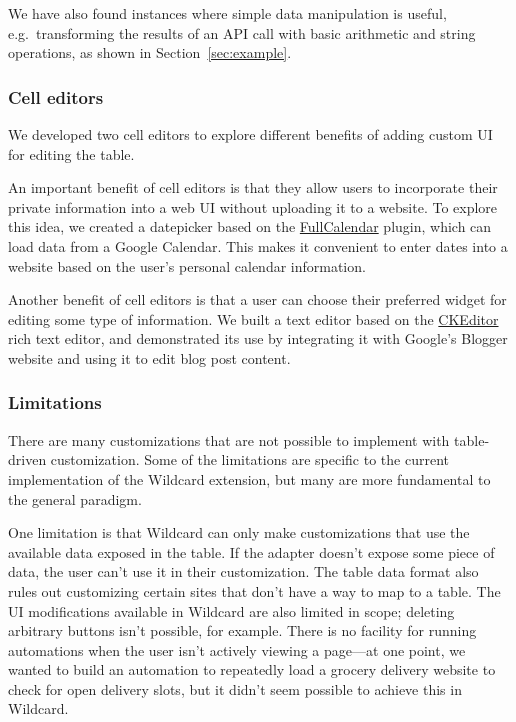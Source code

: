 \documentclass[sigplan,screen,10pt,anonymous,review]{acmart}
\begin{document}
We have also found instances where simple data manipulation is useful,
e.g.~transforming the results of an API call with basic arithmetic and
string operations, as shown in Section~\ref{sec:example}.

\hypertarget{cell-editors}{%
\subsubsection{Cell editors}\label{cell-editors}}

We developed two cell editors to explore different benefits of adding
custom UI for editing the table.

An important benefit of cell editors is that they allow users to
incorporate their private information into a web UI without uploading it
to a website. To explore this idea, we created a datepicker based on the
\href{https://fullcalendar.io/}{FullCalendar} plugin, which can load
data from a Google Calendar. This makes it convenient to enter dates
into a website based on the user's personal calendar information.

Another benefit of cell editors is that a user can choose their
preferred widget for editing some type of information. We built a text
editor based on the \href{https://ckeditor.com/}{CKEditor} rich text
editor, and demonstrated its use by integrating it with Google's Blogger
website and using it to edit blog post content.

\hypertarget{limitations}{%
\subsubsection{Limitations}\label{limitations}}

There are many customizations that are not possible to implement with
table-driven customization. Some of the limitations are specific to the
current implementation of the Wildcard extension, but many are more
fundamental to the general paradigm.

One limitation is that Wildcard can only make customizations that use
the available data exposed in the table. If the adapter doesn't expose
some piece of data, the user can't use it in their customization. The
table data format also rules out customizing certain sites that don't
have a way to map to a table. The UI modifications available in Wildcard
are also limited in scope; deleting arbitrary buttons isn't possible,
for example. There is no facility for running automations when the user
isn't actively viewing a page---at one point, we wanted to build an
automation to repeatedly load a grocery delivery website to check for
open delivery slots, but it didn't seem possible to achieve this in
Wildcard.
\end{document}
